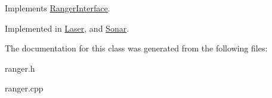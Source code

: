 Implements \hyperlink{class_ranger_interface_a70357ca516198af45e2d503ef6af8f9f}{Ranger\+Interface}.



Implemented in \hyperlink{class_laser_a5f140784aae7e82c2aa0f690548d6ebb}{Laser}, and \hyperlink{class_sonar_a74d551d0ad61861ccf903f2535d799f0}{Sonar}.



The documentation for this class was generated from the following files\+:\begin{DoxyCompactItemize}
\item 
ranger.\+h\item 
ranger.\+cpp\end{DoxyCompactItemize}
